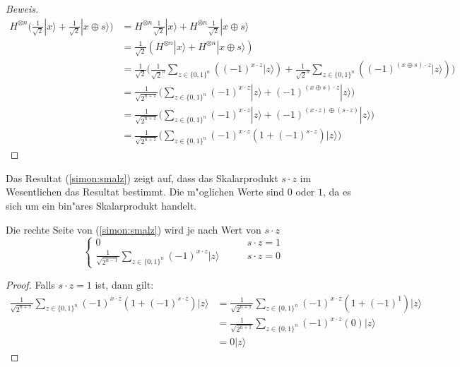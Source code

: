 \begin{refsection}
\begin{proof}[Beweis]
\begin{align*}
    H^{ \otimes n } \biggl( 
                     \frac{1}{\sqrt{2}} |x\rangle + 
                     \frac{1}{\sqrt{2}} |x \oplus s\rangle 
                     \biggr)
    &= H^{ \otimes n } \frac{1}{\sqrt{2}} |x\rangle + 
       H^{ \otimes n } \frac{1}{\sqrt{2}} |x \oplus s\rangle 
    \\ 
    &= \frac1{\sqrt{2}} ( H^{ \otimes n } |x\rangle + H^{ \otimes n } |x \oplus s\rangle )
    \\
    &= \frac1{\sqrt{2}}
       \biggl( \frac1{\sqrt{2}^n} \sum_{z \in \{0,1\}^n} {( (-1)^{x \cdot z} |z\rangle )} + 
               \frac1{\sqrt{2}^n}  \sum_{z \in \{0,1\}^n} { ( (-1)^{(x \oplus s) \cdot z } |z\rangle)}
       \biggr)
    \\
    &= \frac1{\sqrt{2^{n + 1}}}
       \biggl( \sum_{z \in \{0,1\}^n}  { 
                   (-1)^{x \cdot z} |z\rangle + (-1)^{(x \oplus s) \cdot z } |z\rangle 
               } 
       \biggr)
    \\
    &= \frac1{\sqrt{2^{n + 1}}}
       \biggl( \sum_{z \in \{0,1\}^n}  { 
                  (-1)^{x \cdot z} |z\rangle + (-1)^{(x \cdot z) \oplus ( s \cdot z) } |z\rangle 
               } 
       \biggr)
    \\
    &= \frac1{\sqrt{2^{n + 1}}}
       \biggl( 
          \sum_{z \in \{0,1\}^n}  { (-1)^{x \cdot z} ( 1 + (-1)^{ s \cdot z}) |z\rangle } 
       \biggr)
\end{align*}
\end{proof}

Das Resultat (\ref{simon:smalz}) zeigt auf, dass das Skalarprodukt $s \cdot z$ im Wesentlichen das
Resultat bestimmt. Die m"oglichen Werte sind $0$ oder $1$, da es sich um ein
bin"ares Skalarprodukt handelt.
\begin{hilfssatz}
  Die rechte Seite von (\ref{simon:smalz}) wird je nach Wert von $s \cdot z$
  \[
    \begin{cases}
      0 & \qquad s \cdot z = 1 \\
     \displaystyle \frac1{\sqrt{2^{n - 1}}} \sum_{z \in \{0,1\}^n}  { (-1)^{x \cdot
     z}|z\rangle } & \qquad s \cdot z = 0
    \end{cases}
  \]
\end{hilfssatz}

\begin{proof}
Falls $s \cdot z = 1$ ist, dann gilt:
\begin{align*}
    \frac1{\sqrt{2^{n + 1}}}
      \sum_{z \in \{0,1\}^n}  { (-1)^{x \cdot z} ( 1 + (-1)^{ s \cdot z}) |z\rangle } 
    &= 
    \frac1{\sqrt{2^{n + 1}}}
      \sum_{z \in \{0,1\}^n}  { (-1)^{x \cdot z} ( 1 + (-1)^1) |z\rangle } 
    \\
    &= 
    \frac1{\sqrt{2^{n + 1}}}
      \sum_{z \in \{0,1\}^n}  { (-1)^{x \cdot z} (0) |z\rangle } 
    \\
    &=
    0 |z\rangle
\end{align*}


\end{proof}
\end{refsection}
